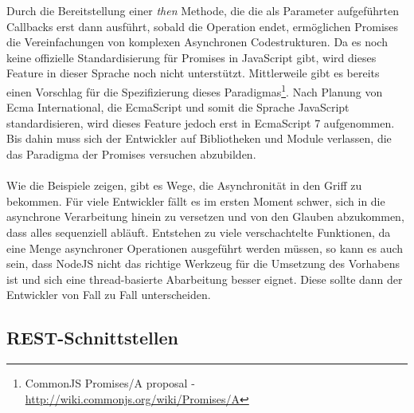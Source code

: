 Durch die Bereitstellung einer \textit{then} Methode, die die als Parameter aufgeführten Callbacks erst dann ausführt, sobald die Operation endet, ermöglichen Promises die Vereinfachungen von komplexen Asynchronen Codestrukturen. Da es noch keine offizielle Standardisierung für Promises in JavaScript gibt, wird dieses Feature in dieser Sprache noch nicht unterstützt. Mittlerweile gibt es bereits einen Vorschlag für die Spezifizierung dieses Paradigmas\footnote{CommonJS Promises/A proposal - \url{http://wiki.commonjs.org/wiki/Promises/A}}. Nach Planung von Ecma International, die EcmaScript und somit die Sprache JavaScript standardisieren, wird dieses Feature jedoch erst in EcmaScript 7 aufgenommen. Bis dahin muss sich der Entwickler auf Bibliotheken und Module verlassen, die das Paradigma der Promises versuchen abzubilden.\\
\\
Wie die Beispiele zeigen, gibt es Wege, die Asynchronität in den Griff zu bekommen. Für viele Entwickler fällt es im ersten Moment schwer, sich in die asynchrone Verarbeitung hinein zu versetzen und von den Glauben abzukommen, dass alles sequenziell abläuft. Entstehen zu viele verschachtelte Funktionen, da eine Menge asynchroner Operationen ausgeführt werden müssen, so kann es auch sein, dass NodeJS nicht das richtige Werkzeug für die Umsetzung des Vorhabens ist und sich eine thread-basierte Abarbeitung besser eignet. Diese sollte dann der Entwickler von Fall zu Fall unterscheiden.

\subsection{REST-Schnittstellen}

